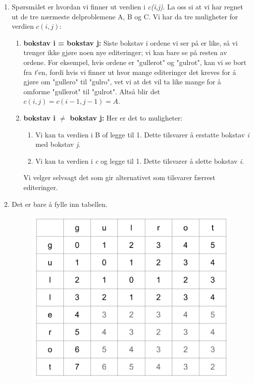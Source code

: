 \begin{enumerate}
    \item Spørsmålet er hvordan vi finner ut verdien i \textit{c(i,j)}. La oss si at vi har regnet ut de tre nærmeste delproblemene A, B og C. Vi har da tre muligheter for verdien $c(i,j)$:
    \begin{enumerate}
        \item \textbf{bokstav i = bokstav j:} Siste bokstav i ordene vi ser på er like, så vi trenger ikke gjøre noen nye editeringer; vi kan bare se på resten av ordene. For eksempel, hvis ordene er "gullerot" og "gulrot", kan vi se bort fra \textit{t}'en, fordi hvis vi finner ut hvor mange editeringer det kreves for å gjøre om "gullero" til "gulro", vet vi at det vil ta like mange for å omforme "gullerot" til "gulrot". Altså blir det $c(i,j) = c(i - 1, j - 1) = A$.
        \item \textbf{bokstav i $\neq$ bokstav j:} Her er det to muligheter:
        \begin{enumerate}
            \item Vi kan ta verdien i B of legge til 1. Dette tilsvarer å erstatte bokstav \textit{i} med bokstav \textit{j}.
            \item Vi kan ta verdien i \textit{c} og legge til 1. Dette tilsvarer å slette bokstav \textit{i}.
        \end{enumerate}
        Vi velger selvsagt det som gir alternativet som tilsvarer færrest editeringer.        
    \end{enumerate}
    \item Det er bare å fylle inn tabellen.
        \begin{figure}[H]
        \includegraphics[scale=0.45]{images/dp}

\end{figure}
\end{enumerate}
